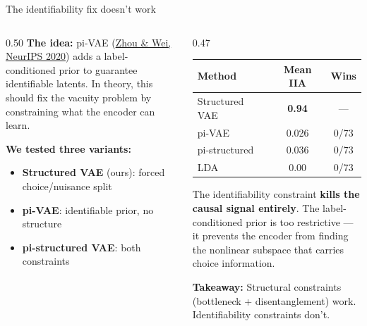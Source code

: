 \documentclass[aspectratio=169,11pt]{beamer}
\begin{document}
\begin{frame}{The identifiability fix doesn't work}

\begin{columns}[T]
\begin{column}{0.50\textwidth}
\textbf{The idea:} pi-VAE (\href{https://arxiv.org/abs/2011.04798}{Zhou \& Wei, NeurIPS 2020}) adds a label-conditioned prior to guarantee identifiable latents. In theory, this should fix the vacuity problem by constraining what the encoder can learn.

\vspace{0.5em}
\textbf{We tested three variants:}
\begin{itemize}\setlength\itemsep{2pt}
  \item {\small \textbf{Structured VAE} (ours): forced choice/nuisance split}
  \item {\small \textbf{pi-VAE}: identifiable prior, no structure}
  \item {\small \textbf{pi-structured VAE}: both constraints}
\end{itemize}
\end{column}

\begin{column}{0.47\textwidth}
\vspace{0.5em}
{\small
\begin{tabular}{lcc}
\toprule
\textbf{Method} & \textbf{Mean IIA} & \textbf{Wins} \\
\midrule
Structured VAE & \textbf{0.94} & --- \\
pi-VAE & 0.026 & 0/73 \\
pi-structured & 0.036 & 0/73 \\
LDA & 0.00 & 0/73 \\
\bottomrule
\end{tabular}
}

\vspace{0.5em}
{\small The identifiability constraint \textbf{kills the causal signal entirely}. The label-conditioned prior is too restrictive --- it prevents the encoder from finding the nonlinear subspace that carries choice information.}

\vspace{0.3em}
{\small \textbf{Takeaway:} Structural constraints (bottleneck + disentanglement) work. Identifiability constraints don't.}
\end{column}
\end{columns}
\end{frame}
\end{document}
